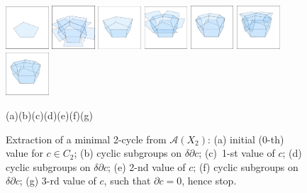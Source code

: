 \documentclass{juliacon}
\begin{document}
\begin{figure}[htbp] %
\hfill\includegraphics[height=0.15\textwidth,width=0.1428\textwidth]{figs/3D1a.png}%
\includegraphics[height=0.15\textwidth,width=0.1428\textwidth]{figs/3D2.png}%
\includegraphics[height=0.15\textwidth,width=0.1428\textwidth]{figs/3D3b.png}%
\includegraphics[height=0.15\textwidth,width=0.1428\textwidth]{figs/3D4a.png}%
\includegraphics[height=0.15\textwidth,width=0.1428\textwidth]{figs/3D5a.png}%
\includegraphics[height=0.15\textwidth,width=0.1428\textwidth]{figs/3D6b.png}%
\includegraphics[height=0.15\textwidth,width=0.1428\textwidth]{figs/3D7a.png}

{\footnotesize\hspace{.06\textwidth}(a)\hfill(b)\hfill(c)\hfill(d)\hfill(e)\hfill(f)\hfill(g)\hspace{.06\textwidth}}

\caption{Extraction of a minimal 2-cycle from $\mathcal{A}(X_2)$: (a) initial (0-th) value for $c\in C_2$; (b) cyclic subgroups on  $\delta\partial c$; (c)~1-st value of $c$; (d) cyclic subgroups on $\delta\partial c$; (e) 2-nd value of $c$; (f) cyclic subgroups on $\delta\partial c$; (g) 3-rd value of $c$, such that $\partial c=0$, hence stop.}
   \label{fig:3D}
\end{figure}
\end{document}
